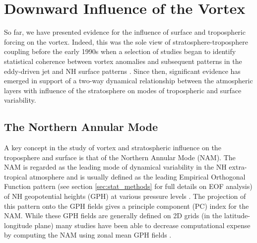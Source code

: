 \section{Downward Influence of the Vortex}
\label{sec:Downward_influence}
So far, we have presented evidence for the influence of surface and tropospheric forcing on the vortex. Indeed, this was the sole view of stratosphere-troposphere coupling before the early 1990s when a selection of studies began to identify statistical coherence between vortex anomalies and subsequent patterns in the eddy-driven jet and NH surface patterns \citep{koderaDownward1990a,nigamStructure1990}. Since then, significant evidence has emerged in support of a two-way dynamical relationship between the atmospheric layers with influence of the stratosphere on modes of tropospheric and surface variability.

\subsection{The Northern Annular Mode}
\label{sec:NAM}

A key concept in the study of vortex and stratospheric influence on the troposphere and surface is that of the Northern Annular Mode (NAM). The NAM is regarded as the leading mode of dynamical variability in the NH extra-tropical atmosphere \citep{thompsonArctic1998, thompsonAnnular2000, baldwinPropagation1999} and is usually defined as the leading Empirical Orthogonal Function pattern (see section \ref{sec:stat_methods} for full details on EOF analysis) of NH geopotential heights (GPH) at various pressure levels \citep{baldwinPropagation1999}. The projection of this pattern onto the GPH fields gives a principle component (PC) index for the NAM. While these GPH fields are generally defined on 2D grids (in the latitude-longitude plane) many studies have been able to decrease computational expense by computing the NAM using zonal mean GPH fields \citep{baldwinCritical2009}. 

